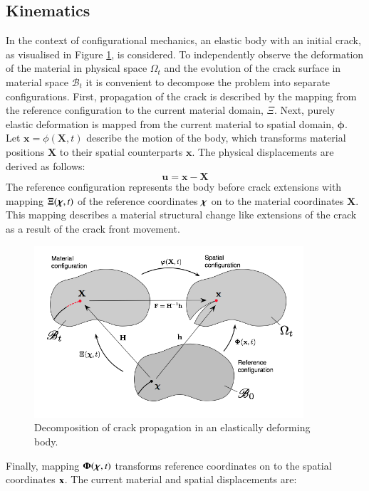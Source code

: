 \documentclass[11pt]{acmeArticle}
\numberwithin{equation}{section}
\begin{document}
\subsection{Kinematics}\label{sec:Kinematics}
In the context of configurational mechanics, an elastic body with an initial crack, as visualised in Figure \ref{fig:frac_kinematics}, is considered. To independently observe the deformation of the material in physical space $\Omega_t$ and the evolution of the crack surface in material space $\mathcal B_t $ it is convenient to decompose the problem into separate configurations. First, propagation of the crack is described by the mapping from the reference configuration to the current material domain, $\Xi$. Next, purely elastic deformation is mapped from the current material to spatial domain, $\mathbf \phi$. Let $\mathbf x = \phi(\mathbf X,t)$ describe the motion of the body, which transforms material positions $\mathbf X$ to their spatial counterparts $\mathbf x$. The physical displacements are derived as follows:
\begin{equation}
\mathbf u = \mathbf x - \mathbf X
\end{equation}
The reference configuration represents the body before crack extensions with mapping $\mathbf \Xi( { \boldsymbol {\rm \chi}}, t)$ of the reference coordinates ${ \boldsymbol {\rm \chi}}$ on to the material coordinates $\mathbf X$. This mapping describes a material structural change like extensions of the crack as a result of the crack front movement. 
\begin{figure}[h!]
	\begin{centering}
		\includegraphics[width=10cm]{Figures/frac_kinematics.png}
		\caption{Decomposition of crack propagation in an elastically deforming body.}
		\label{fig:frac_kinematics}
	\end{centering}
\end{figure}
Finally, mapping $\mathbf \Phi ({ \boldsymbol {\rm \chi}},t)$ transforms reference coordinates on to the spatial coordinates ${\boldsymbol {\rm x}}$. The current material and spatial displacements are:
\end{document}
